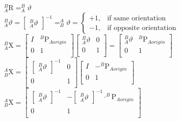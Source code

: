 \documentclass[12pt,fleqn]{standalone}
\begin{document}
\begin{preview}

${\displaystyle _{A}^{B}\textrm{R} = _{A}^{B}{\vartheta}}$\\
${\displaystyle _{A}^{B}{\vartheta}=\begin{bmatrix}_{A}^{B}{\vartheta}\end{bmatrix}_{}^{-1} = _{B}^{A}{\vartheta}}=\begin{cases} +1, & \text{if same orientation}\  \\
-1, & \text{if opposite orientation}
\end{cases}$
\\

${\displaystyle _{A}^{B}\textrm{X} =\begin{bmatrix}
I & _{}^{B}\textrm{P}_{A origin}^{} \\
0 & 1 \\
\end{bmatrix}\begin{bmatrix}
_{A}^{B}{\vartheta} & 0 \\
0 & 1 \\
\end{bmatrix}=\begin{bmatrix}
_{A}^{B}{\vartheta} & _{}^{B}\textrm{P}_{A origin}^{} \\
0 & 1 \\
\end{bmatrix}}$ \\

${\displaystyle _{B}^{A}\textrm{X}=\begin{bmatrix}
\begin{bmatrix}
_{A}^{B}{\vartheta}\end{bmatrix}_{}^{-1} &  0\\
0 & 1 \\
\end{bmatrix}\begin{bmatrix}
I & -_{}^{B}\textrm{P}_{A origin}^{} \\
0 & 1 \\
\end{bmatrix}}$\\
${\displaystyle _{B}^{A}\textrm{X}=\begin{bmatrix}
\begin{bmatrix}
_{A}^{B}{\vartheta}\end{bmatrix}_{}^{-1} & -\begin{bmatrix}
_{A}^{B}{\vartheta}\end{bmatrix}_{}^{-1} \cdot _{}^{B}\textrm{P}_{A origin}^{}\\
0 & 1 \\
\end{bmatrix}}$

\end{preview}
\end{document}
